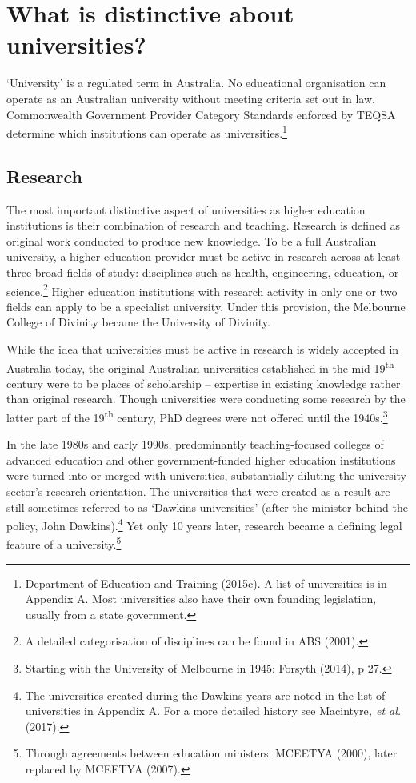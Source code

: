 \documentclass{grattan}
\begin{document}
%
\section{What is distinctive about universities?}\label{sec:what-is-distinctive-about-universities}

`University' is a regulated term in Australia. No educational organisation can operate as an Australian university without meeting criteria set out in law. Commonwealth Government Provider Category Standards enforced by TEQSA determine which institutions can operate as universities.\footnote{Department of Education and Training (2015c). A list of universities is in Appendix A. Most universities also have their own founding legislation, usually from a state government.}

%
\subsection{Research}\label{subsec:research}

The most important distinctive aspect of universities as higher education institutions is their combination of research and teaching. Research is defined as original work conducted to produce new knowledge. To be a full Australian university, a higher education provider must be active in research across at least three broad fields of study: disciplines such as health, engineering, education, or science.\footnote{A detailed categorisation of disciplines can be found in ABS (2001).} Higher education institutions with research activity in only one or two fields can apply to be a specialist university. Under this provision, the Melbourne College of Divinity became the University of Divinity.

While the idea that universities must be active in research is widely accepted in Australia today, the original Australian universities established in the mid-19\textsuperscript{th} century were to be places of scholarship -- expertise in existing knowledge rather than original research. Though universities were conducting some research by the latter part of the 19\textsuperscript{th} century, PhD degrees were not offered until the 1940s.\footnote{Starting with the University of Melbourne in 1945: Forsyth (2014), p 27.}

In the late 1980s and early 1990s, predominantly teaching-focused colleges of advanced education and other government-funded higher education institutions were turned into or merged with universities, substantially diluting the university sector's research orientation. The universities that were created as a result are still sometimes referred to as `Dawkins universities' (after the minister behind the policy, John Dawkins).\footnote{The universities created during the Dawkins years are noted in the list of universities in Appendix A. For a more detailed history see Macintyre\emph{, et al.} (2017).} Yet only 10 years later, research became a defining legal feature of a university.\footnote{Through agreements between education ministers: MCEETYA (2000), later replaced by MCEETYA (2007).}
\end{document}
